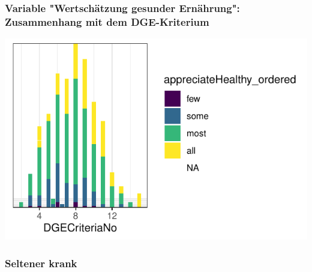 \begin{frame}[fragile]
\begin{itemize}
\begin{frame}[fragile]
\begin{knitrout}
{}



\end{knitrout}
\end{frame}

\begin{frame}[fragile]
\frametitle{Variable "Wertschätzung gesunder Ernährung": Zusammenhang mit dem DGE-Kriterium}
\begin{knitrout}\footnotesize
{}\color{fgcolor}

{\centering \includegraphics[width=\maxwidth]{figure/beamer-appreciateDGEplot-1} 

}



\end{knitrout}
\end{frame}

\begin{frame}[fragile]
\frametitle{Seltener krank}


\end{frame}
\end{itemize}
\end{frame}
